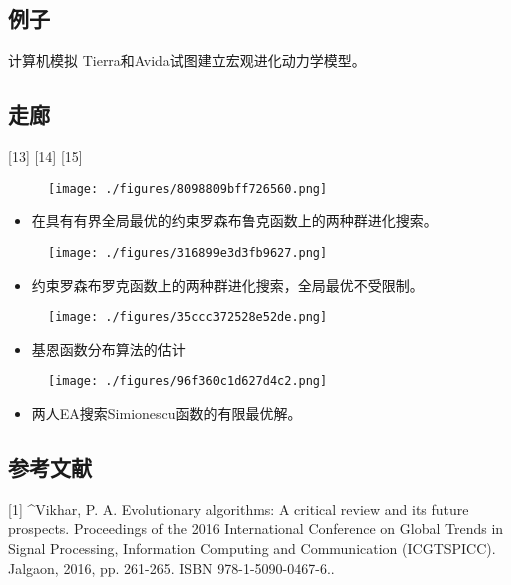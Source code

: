 \subsection{例子}
计算机模拟 Tierra和Avida试图建立宏观进化动力学模型。

\subsection{走廊}
[13] [14] [15]
\begin{figure}[ht]
\centering
\texttt{[image: ./figures/8098809bff726560.png]}
\caption\label{fig_JHSF_1}
\end{figure}
\begin{itemize}
\item 在具有有界全局最优的约束罗森布鲁克函数上的两种群进化搜索。
\end{itemize}
\begin{figure}[ht]
\centering
\texttt{[image: ./figures/316899e3d3fb9627.png]}
\caption\label{fig_JHSF_2}
\end{figure}
\begin{itemize}
\item 约束罗森布罗克函数上的两种群进化搜索，全局最优不受限制。
\end{itemize}
\begin{figure}[ht]
\centering
\texttt{[image: ./figures/35ccc372528e52de.png]}
\caption\label{fig_JHSF_3}
\end{figure}
\begin{itemize}
\item 基恩函数分布算法的估计
\end{itemize}
\begin{figure}[ht]
\centering
\texttt{[image: ./figures/96f360c1d627d4c2.png]}
\caption\label{fig_JHSF_4}
\end{figure}
\begin{itemize}
\item 两人EA搜索Simionescu函数的有限最优解。
\end{itemize}

\subsection{参考文献}
[1]
^Vikhar, P. A. Evolutionary algorithms: A critical review and its future prospects. Proceedings of the 2016 International Conference on Global Trends in Signal Processing, Information Computing and Communication (ICGTSPICC). Jalgaon, 2016, pp. 261-265. ISBN 978-1-5090-0467-6..

